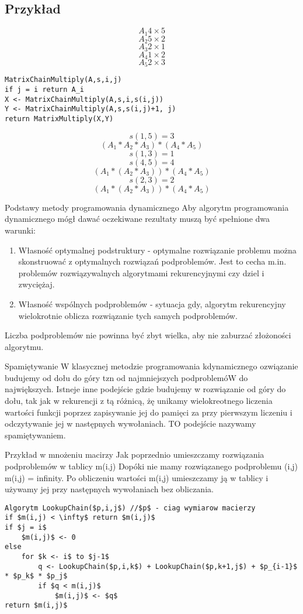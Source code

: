 \subsection{Przykład}
$$ A_1 4 \times 5 $$
$$ A_2 5 \times 2 $$
$$ A_3 2 \times 1 $$
$$ A_4 1 \times 2 $$
$$ A_5 2 \times 3 $$

\begin{lstlisting}
MatrixChainMultiply(A,s,i,j)
if j = i return A_i
X <- MatrixChainMultiply(A,s,i,s(i,j))
Y <- MatrixChainMultiply(A,s,s(i,j)+1, j)
return MatrixMultiply(X,Y)
\end{lstlisting}

$$s(1,5) = 3$$
$$(A_1 * A_2 * A_3) * (A_4 * A_5)$$
$$s(1,3) = 1$$
$$s(4,5) = 4$$
$$(A_1 * (A_2 * A_3)) * (A_4 * A_5)$$
$$s(2,3) = 2$$
$$(A_1 * (A_2 * A_3)) * (A_4 * A_5)$$

Podstawy metody programowania dynamicznego
Aby algorytm programowania dynamicznego mógł dawać oczekiwane rezultaty muszą być spełnione dwa warunki:

\begin{enumerate}
\item Własność optymalnej podstruktury - optymalne rozwiązanie problemu można skonstruować z optymalnych rozwiązań podproblemów. Jest to cecha m.in. problemów rozwiązywalnych algorytmami rekurencyjnymi czy dziel i zwyciężaj.
\item Własność wspólnych podproblemów - sytuacja gdy, algorytm rekurencyjny wielokrotnie oblicza rozwiązanie tych samych podproblemów.
\end{enumerate}
Liczba podproblemów nie powinna być zbyt wielka, aby nie zaburzać złożoności algorytmu.

Spamiętywanie
W klasycznej metodzie programowania kdynamicznego ozwiązanie budujemy od dołu do góry tzn od najmniejszych podproblemóW do największych. Istneje inne podejście gdzie budujemy w rozwiązanie od góry do dołu, tak jak w rekurencji z tą różnicą, żę unikamy wielokreotnego liczenia wartości funkcji poprzez zapisywanie jej do pamięci za przy pierwszym liczeniu  i odczytywanie jej w następnych wywołaniach. TO podejście nazywamy spamiętywaniem.

Przykład w mnożeniu macirzy
Jak poprzednio umieszczamy rozwiązania podproblemów w tablicy m(i.j) Dopóki nie mamy rozwiązanego podproblemu (i,j)  m(i,j) = infinity. Po obliczeniu wartości m(i,j) umieszczamy ją w tablicy i używamy jej przy następnych wywołaniach bez obliczania.

\begin{lstlisting}
Algorytm LookupChain($p,i,j$) //$p$ - ciag wymiarow macierzy
if $m(i,j) < \infty$ return $m(i,j)$
if $j = i$ 
	$m(i,j)$ <- 0 
else
	for $k <- i$ to $j-1$
		q <- LookupChain($p,i,k$) + LookupChain($p,k+1,j$) + $p_{i-1}$ * $p_k$ * $p_j$
		if $q < m(i,j)$
			$m(i,j)$ <- $q$
return $m(i,j)$
\end{lstlisting}

